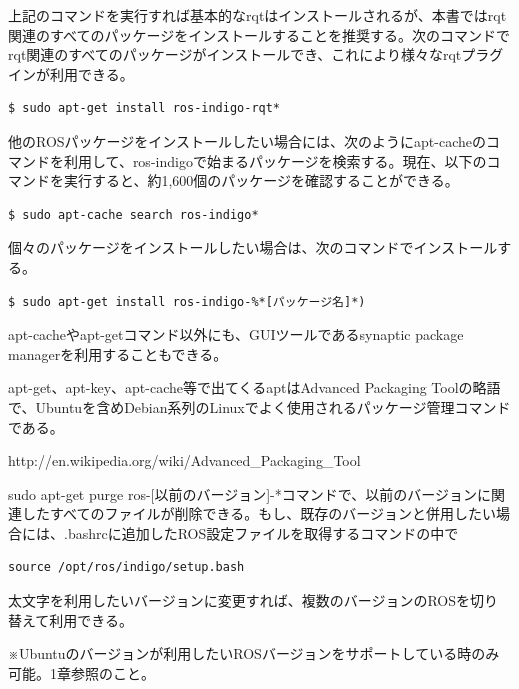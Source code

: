 上記のコマンドを実行すれば基本的なrqtはインストールされるが、本書ではrqt関連のすべてのパッケージをインストールすることを推奨する。次のコマンドでrqt関連のすべてのパッケージがインストールでき、これにより様々なrqtプラグインが利用できる。

\begin{lstlisting}[language=ROS]
$ sudo apt-get install ros-indigo-rqt*
\end{lstlisting}

\begin{exercise}[ROSパッケージのバイナリのインストール]
  他のROSパッケージをインストールしたい場合には、次のようにapt-cacheのコマンドを利用して、ros-indigoで始まるパッケージを検索する。現在、以下のコマンドを実行すると、約1,600個のパッケージを確認することができる。

  \begin{lstlisting}[language=ROS]
  $ sudo apt-cache search ros-indigo*
  \end{lstlisting}

  個々のパッケージをインストールしたい場合は、次のコマンドでインストールする。

  \begin{lstlisting}[language=ROS]
  $ sudo apt-get install ros-indigo-%*[パッケージ名]*)
  \end{lstlisting}

  apt-cacheやapt-getコマンド以外にも、GUIツールであるsynaptic package managerを利用することもできる。
\end{exercise}

\begin{exercise}
  apt-get、apt-key、apt-cache等で出てくるaptはAdvanced Packaging Toolの略語で、Ubuntuを含めDebian系列のLinuxでよく使用されるパッケージ管理コマンドである。

  http://en.wikipedia.org/wiki/Advanced\_Packaging\_Tool
\end{exercise}

\begin{exercise}[以前のバージョンのROSの削除と他のROSバージョンの併用]
  sudo apt-get purge ros-[以前のバージョン]-*コマンドで、以前のバージョンに関連したすべてのファイルが削除できる。もし、既存のバージョンと併用したい場合には、.bashrcに追加したROS設定ファイルを取得するコマンドの中で

  \begin{lstlisting}[language=ROS]
source /opt/ros/indigo/setup.bash
  \end{lstlisting}

  太文字を利用したいバージョンに変更すれば、複数のバージョンのROSを切り替えて利用できる。

 ※Ubuntuのバージョンが利用したいROSバージョンをサポートしている時のみ可能。1章参照のこと。
\end{exercise}

